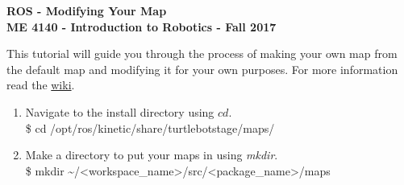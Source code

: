 \documentclass[12pt]{article}
\newcommand{\R}{\color{red}}
\newcommand{\K}{\color{black}}
\newcommand{\G}{\color{mygreen}}
\newcommand{\pkgname}{\G<package\_name>\K}
\newcommand{\wspname}{\R<workspace\_name>\K}
\newcommand{\home}{\textasciitilde/}
\newcommand{\rosdistro}{kinetic}
\begin{document}
\thispagestyle{plain}

\begin{center}
   {\bf \Large ROS - Modifying Your Map }\vspace{2mm} \\
   {\bf \large ME 4140 - Introduction to Robotics - Fall 2017} \\
\end{center}

This tutorial will guide you through the process of making your own map from the default map and modifying it for your own purposes. For more information read the \href{http://wiki.ros.org/turtlebot_stage/Tutorials/indigo/Customizing%20the%20Stage%20Simulator}{wiki}.\\

\begin{enumerate}
    \item Navigate to the install directory using $cd$. \vspace{4mm}\\   
        {\selectfont
        \$ cd /opt/ros/\rosdistro/share/turtlebot\textunderscore stage/maps/} 
    \item Make a directory to put your maps in using {\it mkdir}.\vspace{4mm}\\
         {\selectfont \$ mkdir \home\wspname/src/\pkgname/maps} 
    

\end{enumerate}
\end{document}
